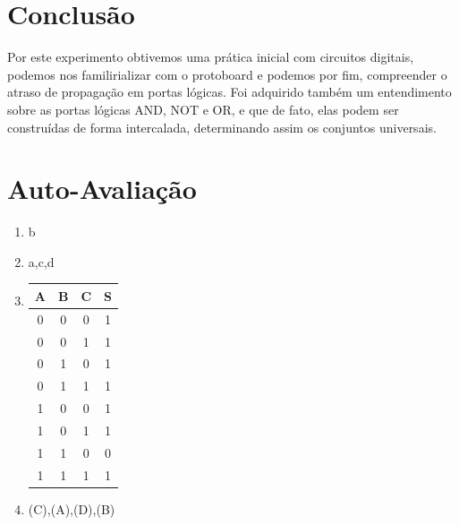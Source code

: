 \documentclass[12pt]{article}
\begin{document}
\section{Conclusão}
\label{sec:Conclusao}
	Por este experimento obtivemos uma prática inicial com circuitos digitais, podemos nos familirializar com o protoboard e podemos por fim, compreender o atraso de propagação em portas  lógicas. 
	Foi adquirido também um entendimento sobre as portas lógicas AND, NOT e OR, e que de fato, elas podem ser construídas de forma intercalada, determinando assim os conjuntos universais.





\newpage 
\section*{Auto-Avaliação}

\begin{enumerate}
    \item b
    \item a,c,d
    \item \begin{table}[H]
	    	\centering
		    	\begin{tabular}{|c|c|c|c|}
	    		\cline{1-4}
	    		\multicolumn{1}{|c|}{A} & \multicolumn{1}{|c|}{B} & \multicolumn{1}{|c|}{C} & \multicolumn{1}{|c|}{S}\\
	    		\hline
	    		0 & 0 & 0 & 1\\
	    		0 & 0 & 1 & 1\\
	    		0 & 1 & 0 & 1\\
	    		0 & 1 & 1 & 1\\
	    		1 & 0 & 0 & 1\\
	    		1 & 0 & 1 & 1\\
	    		1 & 1 & 0 & 0\\
	    		1 & 1 & 1 & 1\\
	    		\hline
		    	\end{tabular}
		    	\label{AAI3}
		    \end{table}
    
    \item (C),(A),(D),(B)
\end{enumerate}
\end{document}
